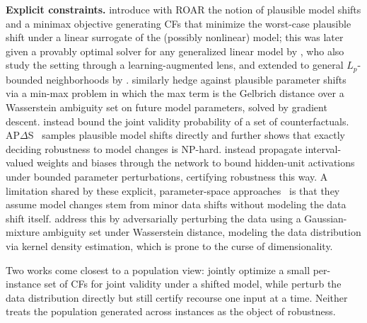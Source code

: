 \textbf{Explicit constraints.}
\citet{upadhyay2021towards} introduce with ROAR the notion of plausible model shifts and a minimax objective generating CFs that minimize the worst-case plausible shift under a linear surrogate of the (possibly nonlinear) model; this was later given a provably optimal solver for any generalized linear model by \citet{kayastha2024learning}, who also study the setting through a learning-augmented lens, and extended to general $L_p$-bounded neighborhoods by \citet{kyaw2025optimal}. \citet{DBLP:conf/iclr/NguyenBN23} similarly hedge against plausible parameter shifts via a min-max problem in which the max term is the Gelbrich distance over a Wasserstein ambiguity set on future model parameters, solved by gradient descent. \citet{bui2022counterfactual} instead bound the joint validity probability of a set of counterfactuals. AP$\Delta$S~\cite{Marzari2024Rigorous,marzari2025probabilistically} samples plausible model shifts directly and further shows that exactly deciding robustness to model changes is NP-hard. \citet{DBLP:conf/acml/JiangLL0T23,jiang2024interval} instead propagate interval-valued weights and biases through the network to bound hidden-unit activations under bounded parameter perturbations, certifying robustness this way.
A limitation shared by these explicit, parameter-space approaches~\cite{upadhyay2021towards,kayastha2024learning,kyaw2025optimal,DBLP:conf/iclr/NguyenBN23,bui2022counterfactual,Marzari2024Rigorous,marzari2025probabilistically,DBLP:conf/acml/JiangLL0T23,jiang2024interval} is that they assume model changes stem from minor data shifts without modeling the data shift itself. \citet{nguyen2022robust} address this by adversarially perturbing the data using a Gaussian-mixture ambiguity set under Wasserstein distance, modeling the data distribution via kernel density estimation, which is prone to the curse of dimensionality.

Two works come closest to a population view: \citet{bui2022counterfactual} jointly optimize a small per-instance set of CFs for joint validity under a shifted model, while \citet{nguyen2022robust} perturb the data distribution directly but still certify recourse one input at a time. Neither treats the population generated across instances as the object of robustness.

